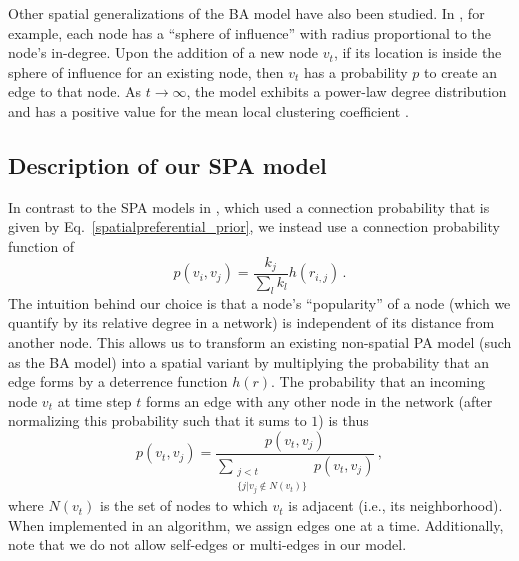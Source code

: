 \documentclass[%
 reprint,
 amsmath,amssymb,
 aps,
]{revtex4-1}
\begin{document}
Other spatial generalizations of the BA model have also been studied. In \cite{aiello, emmanuel}, for example, each node has a ``sphere of influence'' with radius proportional to the node's in-degree. Upon the addition of a new node $v_t$, if its location is inside the sphere of influence for an existing node, then $v_t$ has a probability $p$ to create an edge to that
node. As $t \rightarrow \infty$, the model exhibits a power-law degree distribution and has a positive value for the mean local clustering coefficient \cite{emmanuel}. 



\subsection{Description of our SPA model}

In contrast to the SPA models in \cite{SPA1,SPA2,SPA3}, which used a connection probability that is given by Eq.~\eqref{spatialpreferential_prior}, we instead use a connection probability function of
\begin{equation} \label{spatialpreferential}
    p(v_i,v_j) = \frac{k_j}{\sum_l k_l}h(r_{i,j})\,.
\end{equation}
The intuition behind our choice is that a node's ``popularity'' of a node (which we quantify by its relative degree in a network) is independent of its distance from another node. This allows us to transform an existing non-spatial PA model (such as the BA model) into a spatial variant by multiplying the probability that an edge forms by a deterrence function $h(r)$. The probability that an incoming node $v_t$ at time step $t$ forms an edge with any other node in the network (after normalizing this probability such that it sums to $1$) is thus
\begin{equation} \label{spatialpreferential_normalized}
	p(v_t, v_j) = \frac{p(v_t, v_j)}{\sum\limits_{\substack{j < t \\ \{j  |  v_j \not\in N(v_t)\}}} p(v_t, v_j)}\,,
\end{equation}
where $N(v_t)$ is the set of nodes to which $v_t$ is adjacent (i.e., its neighborhood). When implemented in an algorithm, we assign edges one at a time. Additionally, note that we do not allow self-edges or multi-edges in our model. 
\end{document}
